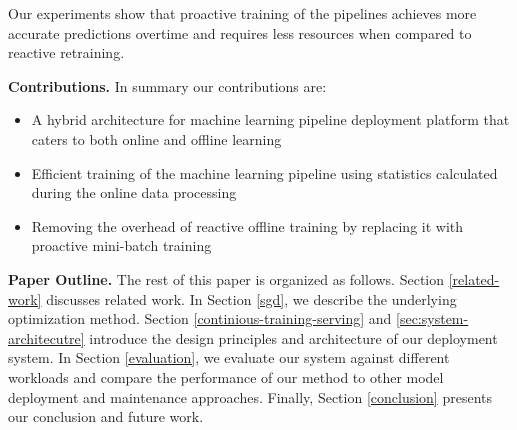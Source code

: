 \documentclass[10pt,conference,letterpaper]{IEEEtran}
\begin{document}
Our experiments show that proactive training of the pipelines achieves more accurate predictions overtime and requires less resources when compared to reactive retraining.

\textbf{Contributions.} In summary our contributions are:
\begin{itemize}
\item A hybrid architecture for machine learning pipeline deployment platform that caters to both online and offline learning
\item Efficient training of the machine learning pipeline using statistics calculated during the online data processing
\item Removing the overhead of reactive offline training by replacing it with proactive mini-batch training
\end{itemize}

\textbf{Paper Outline.}
The rest of this paper is organized as follows. 
Section \ref {related-work} discusses related work.
In Section \ref{sgd}, we describe the underlying optimization method.
Section \ref{continious-training-serving} and \ref{sec:system-architecutre} introduce the design principles and architecture of our deployment system.
In Section \ref{evaluation}, we evaluate our system against different workloads and compare the performance of our method to other model deployment and maintenance approaches. 
Finally, Section \ref{conclusion} presents our conclusion and future work.
%
\end{document}
